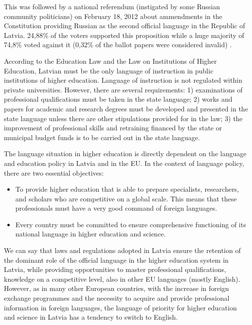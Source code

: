 \begin{multicols}{2}
This was followed by a national referendum (instigated by some Russian community politicians) on February 18, 2012 about ammendments in the Constitution providing Russian as the second official language in the Republic of Latvia. 
24,88\% of the voters supported this proposition while a huge majority of 74,8\% voted against it (0,32\% of the ballot papers were considered invalid) \cite{Meta56}.

According to the Education Law and the Law on Institutions of Higher Education, Latvian must be the only language of instruction in public institutions of higher education.
Language of instruction is not regulated within private universities.
However, there are several requirements: 1) examinations of professional qualifications must be taken in the state language; 2) works and papers for academic and research degrees must be developed and presented in the state language unless there are other stipulations provided for in the law; 3) the improvement of professional skills and retraining financed by the state or municipal budget funds is to be carried out in the state language.

The language situation in higher education is directly dependent on the language and education policy in Latvia and in the EU.
In the context of language policy, there are two essential objectives:

\begin{itemize}
\item  To provide higher education that is able to prepare specialists, researchers, and scholars who are competitive on a global scale.
This means that these professionals must have a very good command of foreign languages.
\item  Every country must be committed to ensure comprehensive functioning of its national language in higher education and science.
\end{itemize}

We can say that laws and regulations adopted in Latvia ensure the retention of the dominant role of the official language in the higher education system in Latvia, while providing opportunities to master professional qualifications, knowledge on a competitive level, also in other EU languages (mostly English).
However, as in many other European countries, with the increase in foreign exchange programmes and the necessity to acquire and provide professional information in foreign languages, the language of priority for higher education and science in Latvia has a tendency to switch to English.


\end{multicols}

